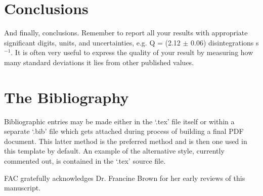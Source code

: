 \section{Conclusions}

And finally, conclusions.  Remember to report all your results with
appropriate significant digits, units, and uncertainties, e.g. Q =
(2.12 $\pm$ 0.06) disintegrations s$^{-1}$.  It is often very useful
to express the quality of your result by measuring how many standard
deviations it lies from other published values.




\section{The Bibliography}
Bibliographic entries may be made either in the `.tex' file itself or within a
separate `.bib' file which gets attached during process of building a
final PDF document.  This latter method is the preferred method and is
then one used in this template by default.  An example of the
alternative style, currently commented out,  is contained in the `.tex' source file.




%


\begin{acknowledgments} FAC gratefully acknowledges Dr. Francine Brown for
her early reviews of this manuscript.
\end{acknowledgments}

